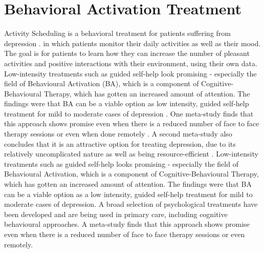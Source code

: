 \section{Behavioral Activation Treatment}
Activity Scheduling is a behavioral treatment for patients suffering from depression \cite{comparative_effectiveness_psycho_treatments}. in which patients monitor their daily activities as well as their mood. The goal is for patients to learn how they can increase the number of pleasant activities and positive interactions with their environment, using their own data. Low-intensity treatments such as guided self-help look promising - especially the field of  Behavioural Activation (BA), which is a component of Cognitive-Behavioural Therapy, which has gotten an increased amount of attention. The findings were that BA can be a viable option as low intensity, guided self-help treatment for mild to moderate cases of depression \cite{behavioural_activation_for_depression}. One meta-study finds that this approach shows promise even when there is a reduced number of face to face therapy sessions or even when done remotely \cite{comparative_effectiveness_psycho_treatments}. A second meta-study also concludes that it is an attractive option for treating depression, due to its relatively uncomplicated nature as well as being resource-efficient \cite{behavioural_activation_meta_analysis}.
%
Low-intensity treatments such as guided self-help looks promising - especially the field of  Behavioural Activation, which is a component of Cognitive-Behavioural Therapy, which has gotten an increased amount of attention. The findings were \cite{behavioural_activation_for_depression} that BA can be a viable option as a low intensity, guided self-help treatment for mild to moderate cases of depression. 
%
A broad selection of psychological treatments have been developed and are being used in primary care, including cognitive behavioural approaches. A meta-study \cite{comparative_effectiveness_psycho_treatments} finds that this approach shows promise even  when there is a reduced number of face to face therapy sessions or even remotely.